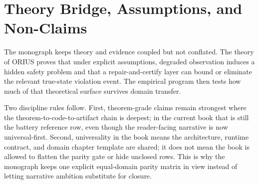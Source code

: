 \chapter{Theory Bridge, Assumptions, and Non-Claims}
\label{ch:theory-bridge}

The monograph keeps theory and evidence coupled but not conflated.  The theory of
ORIUS proves that under explicit assumptions, degraded observation induces a hidden
safety problem and that a repair-and-certify layer can bound or eliminate the relevant
true-state violation event.  The empirical program then tests how much of that
theoretical surface survives domain transfer.

Two discipline rules follow.  First, theorem-grade claims remain strongest where the
theorem-to-code-to-artifact chain is deepest; in the current book that is still the
battery reference row, even though the reader-facing narrative is now universal-first.
Second, universality in the book means the architecture, runtime contract, and domain
chapter template are shared; it does not mean the book is allowed to flatten the parity
gate or hide unclosed rows.  This is why the monograph keeps one explicit equal-domain
parity matrix in view instead of letting narrative ambition substitute for closure.
